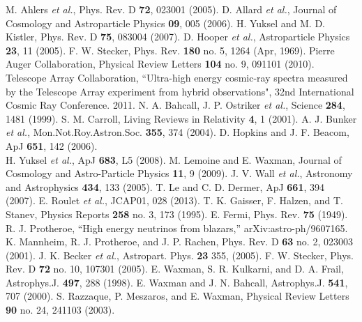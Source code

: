 \begin{thebibliography}{1}
 M. Ahlers {\it et al.}, Phys. Rev. D \textbf{72},  023001 (2005).
  D. Allard {\it et al.}, Journal of Cosmology and Astroparticle Physics \textbf{09},  005 (2006).
H. Yuksel and M. D. Kistler, Phys. Rev. D \textbf{75}, 083004 (2007).
 D. Hooper {\it et al.}, Astroparticle Physics \textbf{23}, 11 (2005).
 F. W. Stecker, Phys. Rev. \textbf{180} no. 5, 1264 (Apr, 1969).
 Pierre Auger Collaboration, Physical Review Letters \textbf{104} no. 9, 091101 (2010).
 Telescope Array Collaboration, 
``Ultra-high energy cosmic-ray spectra measured by the Telescope Array experiment from hybrid observations", 
32nd International Cosmic Ray Conference. 2011.
 N. A. Bahcall, J. P. Ostriker {\it et al.}, Science \textbf{284}, 1481 (1999).
 S. M. Carroll, Living Reviews in Relativity \textbf{4}, 1 (2001).
 A. J. Bunker {\it et al.}, Mon.Not.Roy.Astron.Soc. \textbf{355}, 374 (2004).
 D. Hopkins and J. F. Beacom, ApJ \textbf{651}, 142 (2006).\\
H. Yuksel {\it et al.}, ApJ \textbf{683}, L5 (2008).
 M. Lemoine and E. Waxman, Journal of Cosmology and Astro-Particle Physics \textbf{11}, 9 (2009).
 J. V. Wall {\it et al.}, Astronomy and Astrophysics \textbf{434}, 133 (2005).
 T. Le and C. D. Dermer, ApJ \textbf{661}, 394 (2007).
 E. Roulet {\it et al.}, JCAP01, 028 (2013).
  T. K. Gaisser, F. Halzen, and T. Stanev, Physics Reports \textbf{258} no. 3, 173 (1995).
 E. Fermi, Phys. Rev. \textbf{75} (1949).
 R. J. Protheroe, “High energy neutrinos from blazars,” arXiv:astro-ph/9607165.
  K. Mannheim, R. J. Protheroe, and J. P. Rachen,  Phys. Rev. D \textbf{63} no. 2, 023003 (2001).
  J. K. Becker {\it et al.}, Astropart. Phys. \textbf{23} 355, (2005).
 F. W. Stecker, Phys. Rev. D \textbf{72} no. 10,  107301 (2005).
 E. Waxman, S. R. Kulkarni, and D. A. Frail,  Astrophys.J. \textbf{497}, 288 (1998).
 E. Waxman and J. N. Bahcall, Astrophys.J. \textbf{541}, 707 (2000).
 S. Razzaque, P. Meszaros, and E. Waxman, Physical Review Letters \textbf{90} no. 24, 241103 (2003).

\end{thebibliography}
